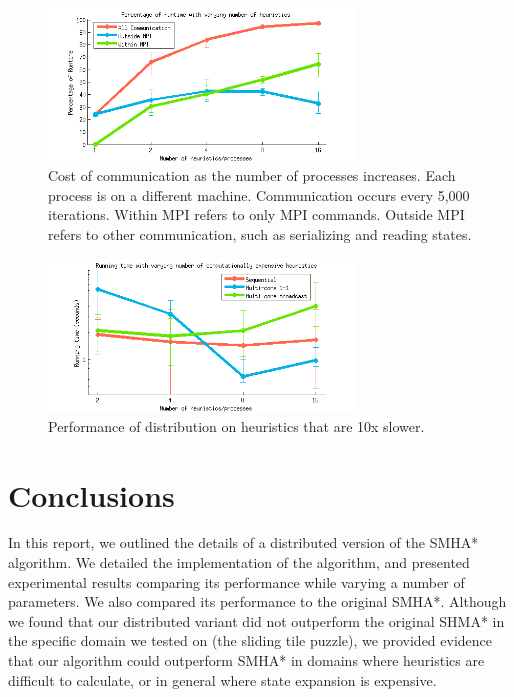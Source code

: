 \documentclass[11pt]{article}
\begin{document}
{\begin{figure}
\centering
\includegraphics[width=3.2in]{graphs/figure5}
\caption{Cost of communication as the number of processes increases. Each process is on a different machine. Communication occurs every 5,000 iterations. Within MPI refers to only MPI commands. Outside MPI refers to other communication, such as serializing and reading states.}
\label{fig5}
\end{figure}

\begin{figure}
\centering
\includegraphics[width=3.2in]{graphs/figure4}
\caption{Performance of distribution on heuristics that are 10x slower.}
\label{fig4}
\end{figure}


\section{Conclusions}

In this report, we outlined the details of a distributed version of the SMHA* algorithm. We detailed the implementation of the algorithm, and presented experimental results comparing its performance while varying a number of parameters. We also compared its performance to the original SMHA*. Although we found that our distributed variant did not outperform the original SHMA* in the specific domain we tested on (the sliding tile puzzle), we provided evidence that our algorithm could outperform SMHA* in domains where heuristics are difficult to calculate, or in general where state expansion is expensive.







}
\end{document}
